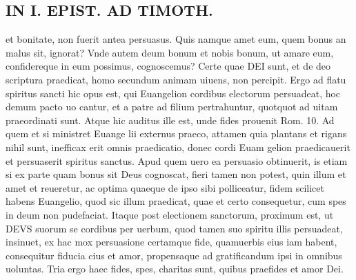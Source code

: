 \documentclass{article}
\begin{document}
\begin{pages}
\section*{IN I. EPIST. AD TIMOTH. }\pstart et bonitate, non fuerit antea persuasus. Quis namque amet eum, quem bonus an malus sit, ignorat? Vnde autem deum bonum et nobis bonum, ut amare eum, confidereque in eum possimus, cognoscemus? Certe quae DEI sunt, et de deo scriptura praedicat, homo secundum animam uiuens, non percipit.   \pend\pstart Ergo ad flatu spiritus sancti hic opus est, qui Euangelion cordibus electorum persuadeat, hoc demum pacto uo cantur, et a patre ad filium pertrahuntur, quotquot ad uitam praeordinati sunt.  Atque hic auditus ille est, unde fides prouenit Rom. 10.  Ad quem et si ministret Euange lii externus praeco, attamen quia plantans et rigans nihil sunt, inefficax erit omnis praedicatio, donec cordi Euam gelion praedicauerit et persuaserit spiritus sanctus.  Apud quem uero ea persuasio obtinuerit, is etiam si ex parte quam bonus sit Deus cognoscat, fieri tamen non potest, quin illum et amet et reueretur, ac optima quaeque de ipso sibi polliceatur, fidem scilicet habens Euangelio, quod sic illum praedicat, quae et certo consequetur, cum spes in deum non pudefaciat.  Itaque post electionem sanctorum, proximum est, ut DEVS suorum se cordibus per uerbum, quod tamen suo spiritu illis persuadeat, insinuet, ex hac mox persuasione certamque fide, quamuerbis eius iam habent, consequitur fiducia cius et amor, propensaque ad gratificandum ipsi in omnibus uoluntas.   \pend\pstart Tria ergo haec fides, spes, charitas sunt, quibus prae\pendVnde fides et amor Dei.  
\end{pages}
\end{document}
